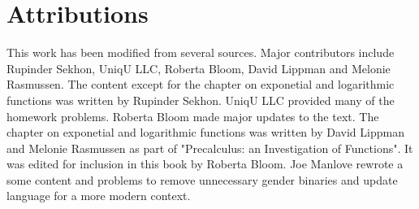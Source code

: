 \chapter{Attributions}

This work has been modified from several sources. Major contributors include Rupinder Sekhon, UniqU LLC, Roberta Bloom, David Lippman and Melonie Rasmussen.  The content except for the chapter on exponetial and logarithmic functions was written by Rupinder Sekhon. UniqU LLC provided many of the homework problems. Roberta Bloom made major updates to the text. The chapter on exponetial and logarithmic functions was written by David Lippman and Melonie Rasmussen as part of "Precalculus: an Investigation of Functions". It was edited for inclusion in this book by Roberta Bloom. Joe Manlove rewrote a some content and problems to remove unnecessary gender binaries and update language for a more modern context.
